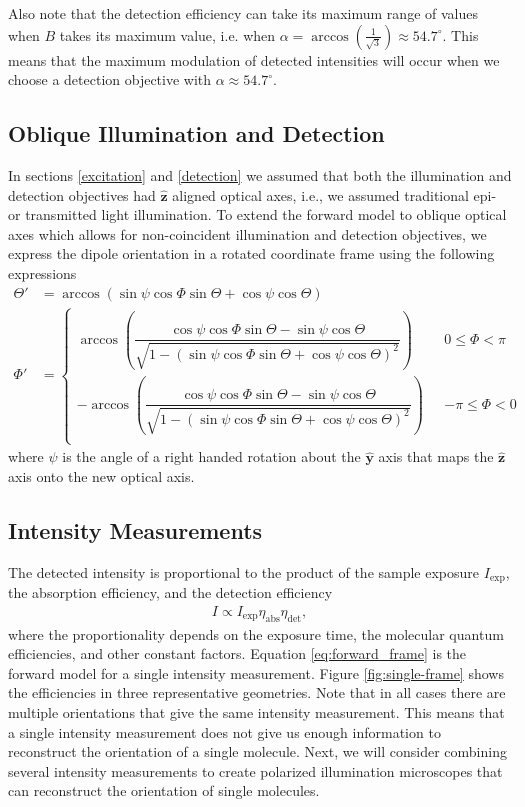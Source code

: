 \documentclass[10pt]{article}
\providecommand{\mh}[1]{\mathbf{\hat{#1}}}
\begin{document}
Also note that the detection efficiency can take its maximum range of values
when $B$ takes its maximum value, i.e. when
$\alpha=\arccos\left(\frac{1}{\sqrt{3}}\right) \approx 54.7^{\circ}$. This means
that the maximum modulation of detected intensities will occur when we choose a
detection objective with $\alpha \approx 54.7^{\circ}$.

\subsection{Oblique Illumination and Detection}\label{oblique}
In sections \ref{excitation} and \ref{detection} we assumed that both the
illumination and detection objectives had $\mh{z}$ aligned optical axes, i.e.,
we assumed traditional epi- or transmitted light illumination. To extend the
forward model to oblique optical axes which allows for non-coincident
illumination and detection objectives, we express the dipole orientation in a
rotated coordinate frame using the following expressions
\begin{align}
    \Theta' &= \arccos\left(\sin\psi\cos\Phi\sin\Theta + \cos\psi\cos\Theta\right)\label{eq:thetap}\\
  \Phi' &=
          \begin{cases}
            \arccos\left(\dfrac{\cos\psi\cos\Phi\sin\Theta - \sin\psi\cos\Theta}{\sqrt{1 - (\sin\psi\cos\Phi\sin\Theta + \cos\psi\cos\Theta)^2}}\right) \ \ \ &0 \leq \Phi < \pi  \\
            -\arccos\left(\dfrac{\cos\psi\cos\Phi\sin\Theta - \sin\psi\cos\Theta}{\sqrt{1 - (\sin\psi\cos\Phi\sin\Theta + \cos\psi\cos\Theta)^2}}\right) \ \ \ &-\pi \leq \Phi < 0\\
          \end{cases}\label{eq:phip}
\end{align}
where $\psi$ is the angle of a right handed rotation about the $\mh{y}$ axis
that maps the $\mh{z}$ axis onto the new optical axis.

\subsection{Intensity Measurements}\label{forward}
The detected intensity is proportional to the product of the sample exposure
$I_{\text{exp}}$, the absorption efficiency, and the detection efficiency
\begin{align}
  I \propto I_{\text{exp}}\eta_{\text{abs}}\eta_{\text{det}}\label{eq:forward_frame},
\end{align}
where the proportionality depends on the exposure time, the molecular quantum
efficiencies, and other constant factors. Equation \ref{eq:forward_frame} is the
forward model for a single intensity measurement. Figure \ref{fig:single-frame}
shows the efficiencies in three representative geometries. Note that in all
cases there are multiple orientations that give the same intensity
measurement. This means that a single intensity measurement does not give us
enough information to reconstruct the orientation of a single molecule. Next, we
will consider combining several intensity measurements to create polarized
illumination microscopes that can reconstruct the orientation of single
molecules.
\end{document}
